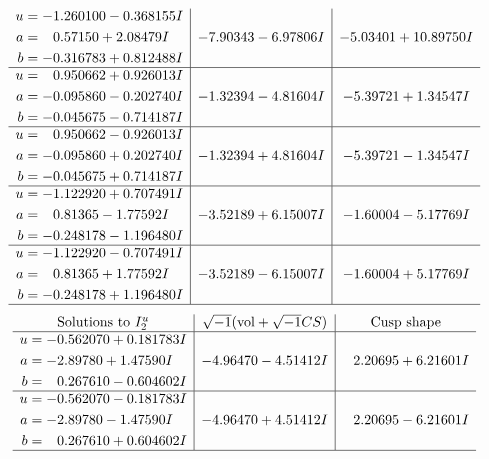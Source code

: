 \documentclass[1p]{elsarticle_modified}
\theoremstyle{definition}
\newcommand{\I}{\sqrt{-1}}
\begin{document}
$$\begin{array}{c|c|c}
\begin{aligned}
u &= -1.260100 - 0.368155 I \\
a &= \phantom{-}0.57150 + 2.08479 I \\
b &= -0.316783 + 0.812488 I\end{aligned}
 & -7.90343 - 6.97806 I & -5.03401 + 10.89750 I \\ \hline\begin{aligned}
u &= \phantom{-}0.950662 + 0.926013 I \\
a &= -0.095860 - 0.202740 I \\
b &= -0.045675 - 0.714187 I\end{aligned}
 & -1.32394 - 4.81604 I & -5.39721 + 1.34547 I \\ \hline\begin{aligned}
u &= \phantom{-}0.950662 - 0.926013 I \\
a &= -0.095860 + 0.202740 I \\
b &= -0.045675 + 0.714187 I\end{aligned}
 & -1.32394 + 4.81604 I & -5.39721 - 1.34547 I \\ \hline\begin{aligned}
u &= -1.122920 + 0.707491 I \\
a &= \phantom{-}0.81365 - 1.77592 I \\
b &= -0.248178 - 1.196480 I\end{aligned}
 & -3.52189 + 6.15007 I & -1.60004 - 5.17769 I \\ \hline\begin{aligned}
u &= -1.122920 - 0.707491 I \\
a &= \phantom{-}0.81365 + 1.77592 I \\
b &= -0.248178 + 1.196480 I\end{aligned}
 & -3.52189 - 6.15007 I & -1.60004 + 5.17769 I\\
 \hline 
 \end{array}$$\newpage$$\begin{array}{c|c|c}  
\text{Solutions to }I^u_{2}& \I (\text{vol} + \sqrt{-1}CS) & \text{Cusp shape}\\
 \hline 
\begin{aligned}
u &= -0.562070 + 0.181783 I \\
a &= -2.89780 + 1.47590 I \\
b &= \phantom{-}0.267610 - 0.604602 I\end{aligned}
 & -4.96470 - 4.51412 I & \phantom{-}2.20695 + 6.21601 I \\ \hline\begin{aligned}
u &= -0.562070 - 0.181783 I \\
a &= -2.89780 - 1.47590 I \\
b &= \phantom{-}0.267610 + 0.604602 I\end{aligned}
 & -4.96470 + 4.51412 I & \phantom{-}2.20695 - 6.21601 I\\
 \hline 
 \end{array}$$\newpage
\end{document}
